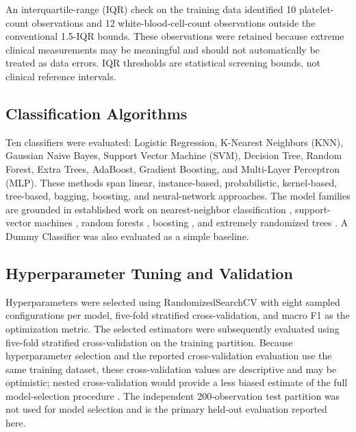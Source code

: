 \documentclass[conference]{IEEEtran}
\begin{document}
An interquartile-range (IQR) check on the training data identified 10 platelet-count observations and 12 white-blood-cell-count observations outside the conventional 1.5-IQR bounds. These observations were retained because extreme clinical measurements may be meaningful and should not automatically be treated as data errors. IQR thresholds are statistical screening bounds, not clinical reference intervals.

\subsection{Classification Algorithms}
Ten classifiers were evaluated: Logistic Regression, K-Nearest Neighbors (KNN), Gaussian Naive Bayes, Support Vector Machine (SVM), Decision Tree, Random Forest, Extra Trees, AdaBoost, Gradient Boosting, and Multi-Layer Perceptron (MLP). These methods span linear, instance-based, probabilistic, kernel-based, tree-based, bagging, boosting, and neural-network approaches. The model families are grounded in established work on nearest-neighbor classification \cite{cover1967nearest}, support-vector machines \cite{cortes1995svm}, random forests \cite{breiman2001rf}, boosting \cite{freund1997boosting,friedman2001gbm}, and extremely randomized trees \cite{geurts2006extratrees}. A Dummy Classifier was also evaluated as a simple baseline.

\subsection{Hyperparameter Tuning and Validation}
Hyperparameters were selected using RandomizedSearchCV with eight sampled configurations per model, five-fold stratified cross-validation, and macro F1 as the optimization metric. The selected estimators were subsequently evaluated using five-fold stratified cross-validation on the training partition. Because hyperparameter selection and the reported cross-validation evaluation use the same training dataset, these cross-validation values are descriptive and may be optimistic; nested cross-validation would provide a less biased estimate of the full model-selection procedure \cite{varma2006cv,cawley2010overfit}. The independent 200-observation test partition was not used for model selection and is the primary held-out evaluation reported here.
\end{document}
